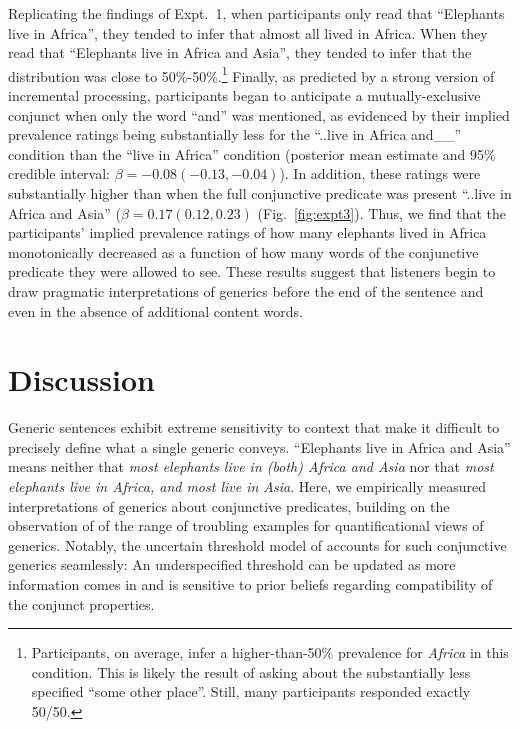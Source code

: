 \documentclass[10pt,letterpaper]{article}
\begin{document}
Replicating the findings of Expt.~1, when participants only read that ``Elephants live in Africa'', they tended to infer that almost all lived in Africa. 
When they read that ``Elephants live in Africa and Asia'', they tended to infer that the distribution was close to 50\%-50\%.\footnote{
Participants, on average, infer a higher-than-50\% prevalence for \emph{Africa} in this condition. 
This is likely the result of asking about the substantially less specified ``some other place''.  Still, many participants responded exactly 50/50.
}
Finally, as predicted by a strong version of incremental processing, participants began to anticipate a mutually-exclusive conjunct when only the word ``and'' was mentioned, as evidenced by their implied prevalence ratings being substantially less for the ``..live in Africa and\_\_'' condition than the ``live in Africa'' condition (posterior mean estimate and 95\% credible interval: $\beta = -0.08 (-0.13, -0.04)$).
In addition, these ratings were substantially higher than when the full conjunctive predicate was present ``..live in Africa and Asia'' ($\beta = 0.17 (0.12, 0.23)$  (Fig.~\ref{fig:expt3}).
Thus, we find that the participants' implied prevalence ratings of how many elephants lived in Africa monotonically decreased as a function of how many words of the conjunctive predicate they were allowed to see. 
These results suggest that listeners begin to draw pragmatic interpretations of generics before the end of the sentence and even in the absence of additional content words. 


\section{Discussion}

Generic sentences exhibit extreme sensitivity to context that make it difficult to precisely define what a single generic conveys. 
``Elephants live in Africa and Asia'' means neither that \emph{most elephants live in (both) Africa and Asia} nor that \emph{most elephants live in Africa, and most live in Asia}.
Here, we empirically measured interpretations of generics about conjunctive predicates, building on the observation of  of the range of troubling examples for quantificational views of generics.
Notably, the uncertain threshold model of  accounts for such conjunctive generics seamlessly: An underspecified threshold can be updated as more information comes in and is sensitive to prior beliefs regarding compatibility of the conjunct properties.
\end{document}
